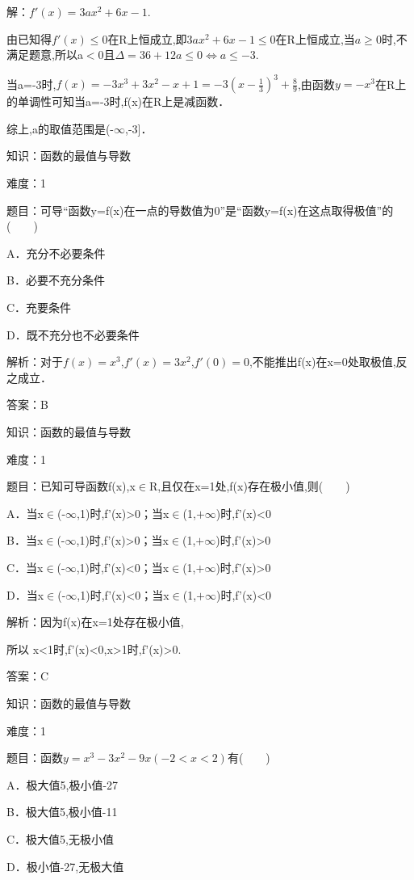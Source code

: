 \documentclass{article} %
\begin{document}
解：$f'(x)=3ax^{2}+6x-1$.

由已知得$f'(x)\le0$在R上恒成立,即$3ax^{2}+6x-1\le0$在R上恒成立,当$a\ge0$时,不满足题意,所以a${<}$0且$\Delta=36+12a\le0\Leftrightarrow a\le-3$.

当a=-3时,$f(x)=-3x^{3}+3x^{2}-x+1=-3{(x-\frac{1}{3})}^3+\frac{8}{9}$,由函数$y=-x^{3}$在R上的单调性可知当a=-3时,f(x)在R上是减函数．

综上,a的取值范围是(-$\infty$,-3]．

\noindent 

知识：函数的最值与导数

难度：1

题目：可导``函数y=f(x)在一点的导数值为0''是``函数y=f(x)在这点取得极值''的(　　)

A．充分不必要条件

B．必要不充分条件

C．充要条件

D．既不充分也不必要条件

解析：对于$f(x)=x^{3}$,$f'(x)=3x^{2}$,$f'(0)=0$,不能推出f(x)在x=0处取极值,反之成立．

答案：B



知识：函数的最值与导数

难度：1

题目：已知可导函数f(x),x${\in}$R,且仅在x=1处,f(x)存在极小值,则(　　)

A．当x${\in}$(-$\infty$,1)时,f'(x)>0；当x${\in}$(1,$+\infty$)时,f'(x)<0

B．当x${\in}$(-$\infty$,1)时,f'(x)>0；当x${\in}$(1,$+\infty$)时,f'(x)>0

C．当x${\in}$(-$\infty$,1)时,f'(x)<0；当x${\in}$(1,$+\infty$)时,f'(x)>0

D．当x${\in}$(-$\infty$,1)时,f'(x)<0；当x${\in}$(1,$+\infty$)时,f'(x)<0

解析：因为f(x)在x=1处存在极小值,

所以 x<1时,f'(x)<0,x>1时,f'(x)>0.

答案：C



知识：函数的最值与导数

难度：1

题目：函数$y=x^{3}-3x^{2}-9x(-2<x<2)$有(　　)

A．极大值5,极小值-27

B．极大值5,极小值-11

C．极大值5,无极小值

D．极小值-27,无极大值
\end{document}
